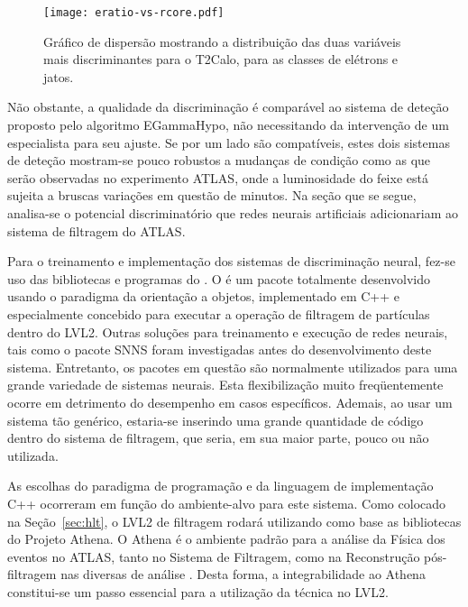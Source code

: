 \begin{figure}
\begin{center}
\texttt{[image: eratio-vs-rcore.pdf]}
\end{center}
\caption{Gráfico de dispersão mostrando a distribuição das duas variáveis mais
discriminantes para o T2Calo, para as classes de elétrons e jatos.}
\label{fig:eratio-vs-rcore}
\end{figure}

Não obstante, a qualidade da discriminação é comparável ao sistema de deteção
proposto pelo algoritmo EGammaHypo, não necessitando da intervenção de um
especialista para seu ajuste. Se por um lado são compatíveis, estes dois
sistemas de deteção mostram-se pouco robustos a mudanças de condição como as
que serão observadas no experimento ATLAS, onde a luminosidade do feixe está
sujeita a bruscas variações em questão de minutos. Na seção que se segue,
analisa-se o potencial discriminatório que redes neurais artificiais
adicionariam ao sistema de filtragem do ATLAS.

Para o treinamento e implementação dos sistemas de discriminação neural, fez-se
uso das bibliotecas e programas do . O  é
um pacote totalmente desenvolvido usando o paradigma da orientação a objetos,
implementado em C++ \cite{stroustrup} e especialmente concebido para executar
a operação de filtragem de partículas dentro do LVL2. Outras soluções para
treinamento e execução de redes neurais, tais como o pacote SNNS \cite{snns}
foram investigadas antes do desenvolvimento deste sistema. Entretanto, os
pacotes em questão são normalmente utilizados para uma grande variedade de
sistemas neurais. Esta flexibilização muito freqüentemente ocorre em
detrimento do desempenho em casos específicos. Ademais, ao usar um sistema tão
genérico, estaria-se inserindo uma grande quantidade de código dentro do
sistema de filtragem, que seria, em sua maior parte, pouco ou não utilizada.

As escolhas do paradigma de programação e da linguagem de implementação C++
ocorreram em função do ambiente-alvo para este sistema. Como colocado na
Seção~\ref{sec:hlt}, o LVL2 de filtragem rodará utilizando como base as
bibliotecas do Projeto Athena. O Athena é o ambiente padrão para a análise da
Física dos eventos no ATLAS, tanto no Sistema de Filtragem, como na
Reconstrução pós-filtragem nas diversas  de análise
. Desta forma, a integrabilidade ao Athena constitui-se um
passo essencial para a utilização da técnica no LVL2.

